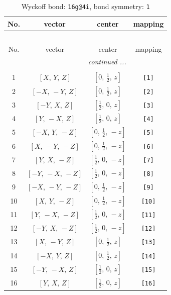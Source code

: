 \documentclass[fleqn,8pt]{jsarticle}
\begin{document}
\begin{longtable}{cccc}
\caption{Wyckoff bond: {\tt 16g@4i}, bond symmetry: {\tt 1}}
 \\
 \hline \hline
No. & vector & center & mapping \\ \hline \endfirsthead

\multicolumn{3}{l}{\tablename\ \thetable{}} \\
 \hline \hline
No. & vector & center & mapping \\ \hline \endhead

 \hline \hline
\multicolumn{3}{r}{\footnotesize\it continued ...} \\ \endfoot

 \hline \hline
\multicolumn{3}{r}{} \\ \endlastfoot

1 & $\left[ X,\, Y,\, Z \right]$ & $\left[ 0,\, \frac{1}{2},\, z \right]$ & {\tt [1]} \\ \hline
2 & $\left[ - X,\, - Y,\, Z \right]$ & $\left[ 0,\, \frac{1}{2},\, z \right]$ & {\tt [2]} \\ \hline
3 & $\left[ - Y,\, X,\, Z \right]$ & $\left[ \frac{1}{2},\, 0,\, z \right]$ & {\tt [3]} \\ \hline
4 & $\left[ Y,\, - X,\, Z \right]$ & $\left[ \frac{1}{2},\, 0,\, z \right]$ & {\tt [4]} \\ \hline
5 & $\left[ - X,\, Y,\, - Z \right]$ & $\left[ 0,\, \frac{1}{2},\, - z \right]$ & {\tt [5]} \\ \hline
6 & $\left[ X,\, - Y,\, - Z \right]$ & $\left[ 0,\, \frac{1}{2},\, - z \right]$ & {\tt [6]} \\ \hline
7 & $\left[ Y,\, X,\, - Z \right]$ & $\left[ \frac{1}{2},\, 0,\, - z \right]$ & {\tt [7]} \\ \hline
8 & $\left[ - Y,\, - X,\, - Z \right]$ & $\left[ \frac{1}{2},\, 0,\, - z \right]$ & {\tt [8]} \\ \hline
9 & $\left[ - X,\, - Y,\, - Z \right]$ & $\left[ 0,\, \frac{1}{2},\, - z \right]$ & {\tt [9]} \\ \hline
10 & $\left[ X,\, Y,\, - Z \right]$ & $\left[ 0,\, \frac{1}{2},\, - z \right]$ & {\tt [10]} \\ \hline
11 & $\left[ Y,\, - X,\, - Z \right]$ & $\left[ \frac{1}{2},\, 0,\, - z \right]$ & {\tt [11]} \\ \hline
12 & $\left[ - Y,\, X,\, - Z \right]$ & $\left[ \frac{1}{2},\, 0,\, - z \right]$ & {\tt [12]} \\ \hline
13 & $\left[ X,\, - Y,\, Z \right]$ & $\left[ 0,\, \frac{1}{2},\, z \right]$ & {\tt [13]} \\ \hline
14 & $\left[ - X,\, Y,\, Z \right]$ & $\left[ 0,\, \frac{1}{2},\, z \right]$ & {\tt [14]} \\ \hline
15 & $\left[ - Y,\, - X,\, Z \right]$ & $\left[ \frac{1}{2},\, 0,\, z \right]$ & {\tt [15]} \\ \hline
16 & $\left[ Y,\, X,\, Z \right]$ & $\left[ \frac{1}{2},\, 0,\, z \right]$ & {\tt [16]} \\
\end{longtable}
\end{document}
